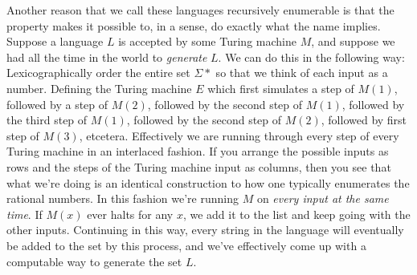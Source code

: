 \documentclass{article}
\theoremstyle{definition}
\theoremstyle{plain}
\theoremstyle{theorem}
\begin{document}
\par Another reason that we call these languages recursively enumerable is that the property makes it possible to, in a sense, do exactly what the name implies. Suppose a language $L$ is accepted by some Turing machine $M$, and suppose we had all the time in the world to \textit{generate} $L$. We can do this in the following way: Lexicographically order the entire set $\Sigma*$ so that we think of each input as a number. Defining the Turing machine $E$ which first simulates a step of $M(1)$, followed by a step of $M(2)$, followed by the second step of $M(1)$, followed by the third step of $M(1)$, followed by the second step of $M(2)$, followed by first step of $M(3)$, etcetera. Effectively we are running through every step of every Turing machine in an interlaced fashion. If you arrange the possible inputs as rows and the steps of the Turing machine input as columns, then you see that what we're doing is an identical construction to how one typically enumerates the rational numbers. In this fashion we're running $M$ on \textit{every input at the same time}. If $M(x)$ ever halts for any $x$, we add it to the list and keep going with the other inputs. Continuing in this way, every string in the language will eventually be added to the set by this process, and we've effectively come up with a computable way to generate the set $L$. 
\end{document}

